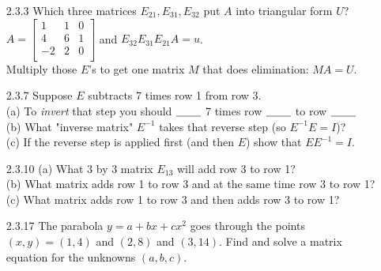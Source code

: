 \documentclass[10pt,twoside,reqno]{article}
\begin{document}
\begin{enumerate}
\item[2.3.3]Which three matrices $E_{21} , E_{31} , E_{32}$ put $A$ into triangular form $U$? \\
\vspace{3mm}
\hspace{100pt}
$
$$
A=
\begin{bmatrix}
1&1&0\\
4&6&1\\
-2&2&0\\
\end{bmatrix}
$$
$
\hspace{10pt}
and
\hspace{10pt}
$E_{32}E_{31}E_{21}A=u$.\\
\vspace{3mm}
Multiply those $E$'s to get one matrix $M$ that does elimination: $MA=U$. 
\vspace{3mm}
\item[2.3.7]Suppose $E$ subtracts 7 times row 1 from row 3.\\
\hspace{25pt}(a) To \textit{invert} that step you should $\underline{\hspace{8mm}}$ 7 times row $\underline{\hspace{8mm}}$ to row $\underline{\hspace{8mm}}$ \\
\hspace{25pt}(b) What "inverse matrix" $E^{-1}$ takes that reverse step (so $E^{-1}E = I$)? \\
\hspace{25pt}(c) If the reverse step is applied first (and then $E$) show that $E E^{-1} = I$. 
\vspace{3mm}
\item[2.3.10](a) What 3 by 3 matrix $E_{13}$ will add row 3 to row 1? \\
(b) What matrix adds row 1 to row 3 and at the same time row 3 to row 1? \\
(c) What matrix adds row 1 to row 3 and then adds row 3 to row 1?
\vspace{3mm}
\item[2.3.17]The parabola $y = a + bx + cx^2$ goes through the points $(x, y) = (1,4)$ and $(2,8)$ and $(3, 14)$. Find and solve a matrix equation for the unknowns $(a, b, c)$. \\

\end{enumerate}
\end{document}
